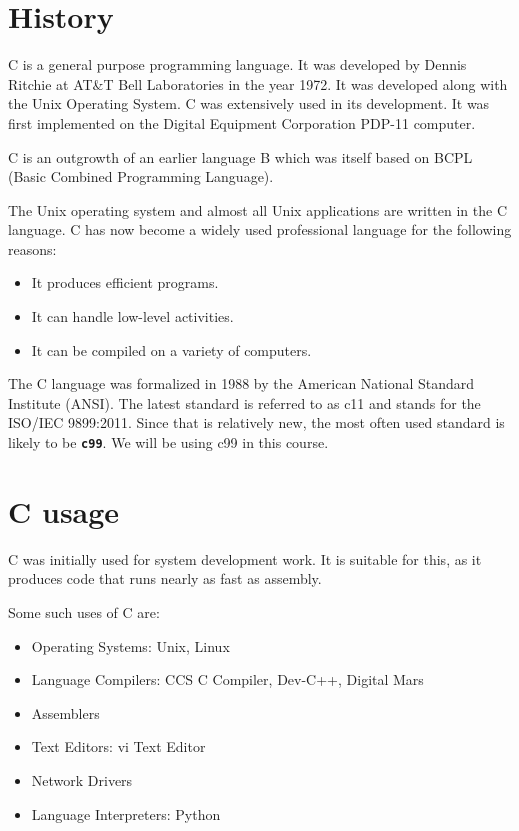 \documentclass[11pt,a4paper]{article}
\author{TalentSprint}
\date{}
\begin{document}

\section*{History}

C is a general purpose programming language. It was developed by Dennis Ritchie at AT\&T  Bell Laboratories in the year 1972. It was developed along with the Unix Operating System. C was extensively used in its development. It was first implemented on the Digital Equipment Corporation PDP-11 computer.

C is an outgrowth of an earlier language B which was itself based on BCPL (Basic Combined Programming Language). 

The Unix operating system and almost all Unix applications are written in the C language. C has now become a widely used professional language for the following reasons:

\begin{itemize}
\item It produces efficient programs.
\item It can handle low-level activities.
\item It can be compiled on a variety of computers.
\end{itemize}

The C language was formalized in 1988 by the American National Standard Institute (ANSI). The latest standard is referred to as c11 and stands for the ISO/IEC 9899:2011. Since that is relatively new, the most often used standard is likely to be \textbf{\texttt{c99}}. We will be using c99 in this course.

\section*{C usage}
C was initially used for system development work. It is suitable for this, as it produces code that runs nearly as fast as assembly. 

Some such uses of C are:
\begin{itemize}
\item  Operating Systems: Unix, Linux
\item  Language Compilers: CCS C Compiler, Dev-C++, Digital Mars
\item  Assemblers
\item  Text Editors: vi Text Editor
\item  Network Drivers
\item  Language Interpreters: Python
\end{itemize}
\end{document}
